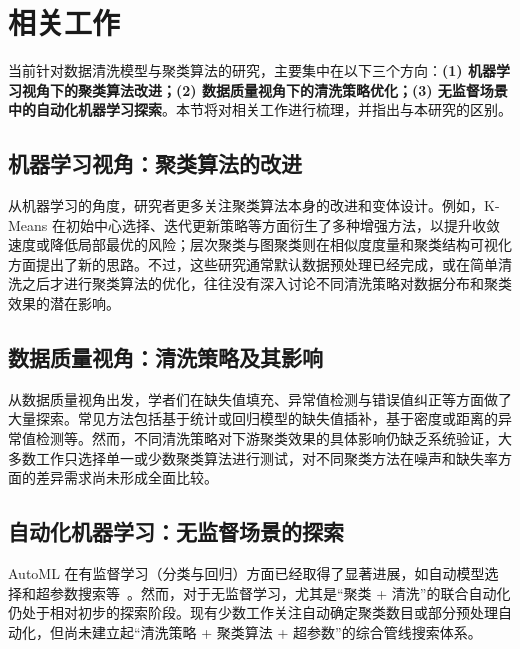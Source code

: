 \documentclass[10pt]{article} %
\numberwithin{equation}{section}
\begin{document}

\section{相关工作}\label{sec:related_work}

当前针对数据清洗模型与聚类算法的研究，主要集中在以下三个方向：\textbf{(1) 机器学习视角下的聚类算法改进；(2) 数据质量视角下的清洗策略优化；(3) 无监督场景中的自动化机器学习探索}。本节将对相关工作进行梳理，并指出与本研究的区别。

\subsection{机器学习视角：聚类算法的改进}
从机器学习的角度，研究者更多关注聚类算法本身的改进和变体设计。例如，K-Means 在初始中心选择、迭代更新策略等方面衍生了多种增强方法，以提升收敛速度或降低局部最优的风险；层次聚类与图聚类则在相似度度量和聚类结构可视化方面提出了新的思路。不过，这些研究通常默认数据预处理已经完成，或在简单清洗之后才进行聚类算法的优化，往往没有深入讨论不同清洗策略对数据分布和聚类效果的潜在影响。

\subsection{数据质量视角：清洗策略及其影响}
从数据质量视角出发，学者们在缺失值填充、异常值检测与错误值纠正等方面做了大量探索。常见方法包括基于统计或回归模型的缺失值插补，基于密度或距离的异常值检测等。然而，不同清洗策略对下游聚类效果的具体影响仍缺乏系统验证，大多数工作只选择单一或少数聚类算法进行测试，对不同聚类方法在噪声和缺失率方面的差异需求尚未形成全面比较。

\subsection{自动化机器学习：无监督场景的探索}
AutoML 在有监督学习（分类与回归）方面已经取得了显著进展，如自动模型选择和超参数搜索等~\cite{ref13, ref14}。然而，对于无监督学习，尤其是“聚类 + 清洗”的联合自动化仍处于相对初步的探索阶段。现有少数工作关注自动确定聚类数目或部分预处理自动化，但尚未建立起“清洗策略 + 聚类算法 + 超参数”的综合管线搜索体系。
\end{document}

